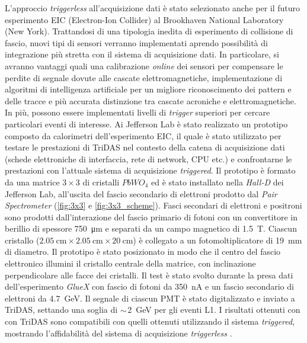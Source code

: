 \documentclass[../main.tex]{subfiles}
\begin{document}
L'approccio \emph{triggerless} all'acquisizione dati è stato selezionato anche per il futuro esperimento EIC (Electron-Ion Collider) al Brookhaven National Laboratory (New York). Trattandosi di una tipologia inedita di esperimento di collisione di fascio, nuovi tipi di sensori verranno implementati aprendo possibilità di integrazione più stretta con il sistema di acquisizione dati. In particolare, si avranno vantaggi quali una calibrazione \emph{online} dei sensori per compensare le perdite di segnale dovute alle cascate elettromagnetiche, implementazione di algoritmi di intelligenza artificiale per un migliore riconoscimento dei pattern e delle tracce e più accurata distinzione tra cascate acroniche e elettromagnetiche. In più, possono essere implementati livelli di \emph{trigger} superiori per cercare particolari eventi di interesse. 
Ai Jefferson Lab è stato realizzato un prototipo composto da calorimetri dell'esperimento EIC, il quale è stato utilizzato per testare le prestazioni di TriDAS nel contesto della catena di acquisizione dati (schede elettroniche di interfaccia, rete di network, CPU etc.) e confrontarne le prestazioni con l'attuale sistema di acquisizione \emph{triggered}. 
Il prototipo è formato da una matrice $3 \times 3$ di cristalli $PbWO_4$ ed è stato installato nella \emph{Hall-D} dei Jefferson Lab, all'uscita del fascio secondario di elettroni prodotto dal \emph{Pair Spectrometer} (\autoref{fig:3x3} e \autoref{fig:3x3_scheme}). Fasci secondari di elettroni e positroni sono prodotti dall'interazione del fascio primario di fotoni con un convertitore in berillio di spessore \SI{750}{\micro\m} e separati da un campo magnetico di \SI{1.5}{\tesla}. 
Ciascun cristallo ($\SI{2.05}{\cm} \times \SI{2.05}{\cm} \times \SI{20}{\cm}$) è collegato a un fotomoltiplicatore di \SI{19}{\mm} di diametro. 
Il prototipo è stato posizionato in modo che il centro del fascio elettronico illumini il cristallo centrale della matrice, con inclinazione perpendicolare alle facce dei cristalli.   
Il test è stato svolto durante la presa dati dell'esperimento \emph{GlueX} con fascio di fotoni da \SI{350}{\nano\ampere} e un fascio secondario di elettroni da \SI{4.7}{\GeV}.
Il segnale di ciascun PMT è stato digitalizzato e inviato a TriDAS, settando una soglia di $\small \sim$\SI{2}{\GeV} per gli eventi L1.
I risultati ottenuti con con TriDAS sono compatibili con quelli ottenuti utilizzando il sistema \emph{triggered}, mostrando l'affidabilità del sistema di acquisizione \emph{triggerless} \cite{3x3telescope}.
\end{document}
